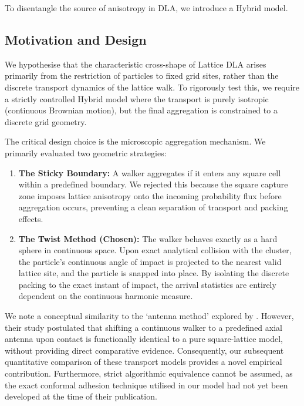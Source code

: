 \documentclass[12pt, a4paper, oneside]{report}
\theoremstyle{remark}
\begin{document}
To disentangle the source of anisotropy in DLA, we introduce a Hybrid model.

\subsection{Motivation and Design}
We hypothesise that the characteristic cross-shape of Lattice DLA arises primarily from the restriction of particles to fixed grid sites, rather than the discrete transport dynamics of the lattice walk. To rigorously test this, we require a strictly controlled Hybrid model where the transport is purely isotropic (continuous Brownian motion), but the final aggregation is constrained to a discrete grid geometry.

The critical design choice is the microscopic aggregation mechanism. We primarily evaluated two geometric strategies:

\begin{enumerate}
    \item \textbf{The Sticky Boundary:} A walker aggregates if it enters any square cell within a predefined boundary. We rejected this because the square capture zone imposes lattice anisotropy onto the incoming probability flux before aggregation occurs, preventing a clean separation of transport and packing effects.
    
    \item \textbf{The Twist Method (Chosen):} The walker behaves exactly as a hard sphere in continuous space. Upon exact analytical collision with the cluster, the particle's continuous angle of impact is projected to the nearest valid lattice site, and the particle is snapped into place. By isolating the discrete packing to the exact instant of impact, the arrival statistics are entirely dependent on the continuous harmonic measure.
\end{enumerate}

We note a conceptual similarity to the `antenna method' explored by \citet{Menshutin2011}. However, their study postulated that shifting a continuous walker to a predefined axial antenna upon contact is functionally identical to a pure square-lattice model, without providing direct comparative evidence. Consequently, our subsequent quantitative comparison of these transport models provides a novel empirical contribution. Furthermore, strict algorithmic equivalence cannot be assumed, as the exact conformal adhesion technique utilised in our model had not yet been developed at the time of their publication.
\end{document}
